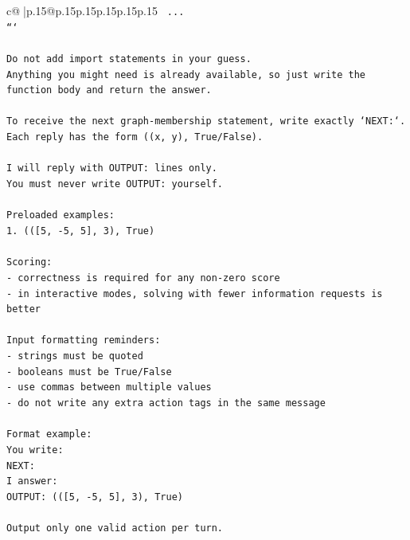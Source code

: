 \documentclass{article}
\begin{document}
{\begin{supertabular}{c@{$\;$}|p{.15\linewidth}@{}p{.15\linewidth}p{.15\linewidth}p{.15\linewidth}p{.15\linewidth}p{.15\linewidth}}
{{{\texttt{    ...} \\
\texttt{```} \\
\\ 
\texttt{Do not add import statements in your guess.} \\
\texttt{Anything you might need is already available, so just write the function body and return the answer.} \\
\\ 
\texttt{To receive the next graph{-}membership statement, write exactly `NEXT:`.} \\
\texttt{Each reply has the form ((x, y), True/False).} \\
\\ 
\texttt{I will reply with OUTPUT: lines only.} \\
\texttt{You must never write OUTPUT: yourself.} \\
\\ 
\texttt{Preloaded examples:} \\
\texttt{1. (({[}5, {-}5, 5{]}, 3), True)} \\
\\ 
\texttt{Scoring:} \\
\texttt{{-} correctness is required for any non{-}zero score} \\
\texttt{{-} in interactive modes, solving with fewer information requests is better} \\
\\ 
\texttt{Input formatting reminders:} \\
\texttt{{-} strings must be quoted} \\
\texttt{{-} booleans must be True/False} \\
\texttt{{-} use commas between multiple values} \\
\texttt{{-} do not write any extra action tags in the same message} \\
\\ 
\texttt{Format example:} \\
\texttt{You write:} \\
\texttt{NEXT:} \\
\texttt{I answer:} \\
\texttt{OUTPUT: (({[}5, {-}5, 5{]}, 3), True)} \\
\\ 
\texttt{Output only one valid action per turn.} \\
            }
        }
    }
     \\ \\


\end{supertabular}}
\end{document}
